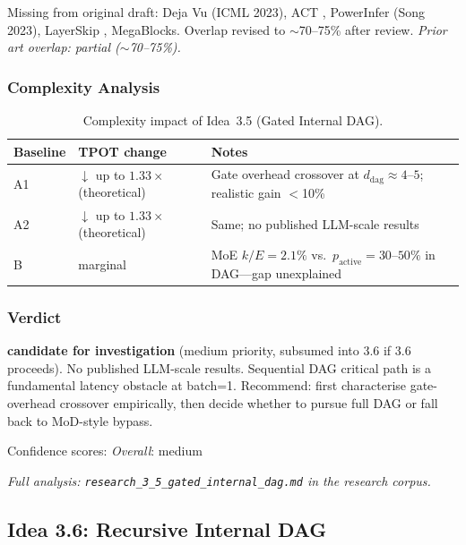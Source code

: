\documentclass[11pt]{article}
\begin{document}
\noindent
Missing from original draft: Deja Vu \cite{LiuEtAl2023DejaVu} (ICML 2023), ACT \cite{Graves2016}, PowerInfer (Song 2023), LayerSkip \cite{ElhoushiEtAl2024}, MegaBlocks.
Overlap revised to $\sim$70--75\% after review.
\emph{Prior art overlap: partial ($\sim$70--75\%).}

\subsubsection*{Complexity Analysis}

\begin{table}[h]
\centering
\caption{Complexity impact of Idea~3.5 (Gated Internal DAG).}
\label{tab:complexity-3-5}
\begin{tabular}{llp{7cm}}
\toprule
\textbf{Baseline} & \textbf{TPOT change} & \textbf{Notes} \\
\midrule
A1 & $\downarrow$ up to $1.33\times$ (theoretical) & Gate overhead crossover at $d_\text{dag}\approx 4$--$5$; realistic gain $<$10\% \\
A2 & $\downarrow$ up to $1.33\times$ (theoretical) & Same; no published LLM-scale results \\
B  & marginal & MoE $k/E=2.1\%$ vs.\ $p_\text{active}=30$--$50\%$ in DAG---gap unexplained \\
\bottomrule
\end{tabular}
\end{table}

\subsubsection*{Verdict}
\textbf{candidate for investigation} (medium priority, subsumed into 3.6 if 3.6 proceeds).
No published LLM-scale results.
Sequential DAG critical path is a fundamental latency obstacle at batch=1.
Recommend: first characterise gate-overhead crossover empirically, then decide whether to pursue full DAG or fall back to MoD-style bypass.

\noindent
Confidence scores:
\emph{Overall}: medium

\par\noindent\textit{Full analysis: \texttt{research\_3\_5\_gated\_internal\_dag.md} in the research corpus.}

\subsection{Idea 3.6: Recursive Internal DAG}
\label{subsec:idea-3-6}
\end{document}
